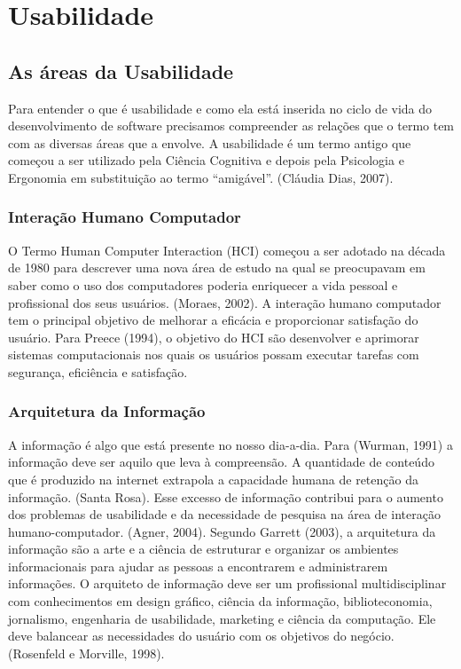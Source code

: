 \chapter{Usabilidade}

\section{As áreas da Usabilidade}

	Para entender o que é usabilidade e como ela está inserida no ciclo de vida do desenvolvimento de software precisamos compreender as relações que o termo tem com as diversas áreas que a envolve.
	A usabilidade é um termo antigo que começou a ser utilizado pela Ciência Cognitiva e depois pela Psicologia e Ergonomia em substituição ao termo “amigável”. (Cláudia Dias, 2007). 

\subsection{Interação Humano Computador}

	O Termo Human Computer Interaction  (HCI) começou a ser adotado na década de 1980 para descrever uma nova área de estudo na qual se preocupavam em saber como o uso dos computadores poderia enriquecer a vida pessoal e profissional dos seus usuários. (Moraes, 2002). 
	A interação humano computador tem o principal objetivo de melhorar a eficácia e proporcionar satisfação do usuário. Para Preece (1994), o objetivo do HCI são desenvolver e aprimorar sistemas computacionais nos quais os usuários possam executar tarefas com segurança, eficiência e satisfação.

	
\subsection{Arquitetura da Informação}

A informação é algo que está presente no nosso dia-a-dia. Para (Wurman, 1991) a informação deve ser aquilo que leva à compreensão. A quantidade de conteúdo que é produzido na internet extrapola a capacidade humana de retenção da informação. (Santa Rosa). Esse excesso de informação contribui para o aumento dos problemas de usabilidade e da necessidade de pesquisa na área de interação humano-computador. (Agner, 2004).
Segundo Garrett (2003), a arquitetura da informação são a arte e a ciência de estruturar e organizar os ambientes informacionais para ajudar as pessoas a encontrarem e administrarem informações.
O arquiteto de informação deve ser um profissional multidisciplinar com conhecimentos em design gráfico, ciência da informação, biblioteconomia, jornalismo, engenharia de usabilidade, marketing e ciência da computação. Ele deve balancear as necessidades do usuário com os objetivos do negócio. (Rosenfeld e Morville, 1998).

